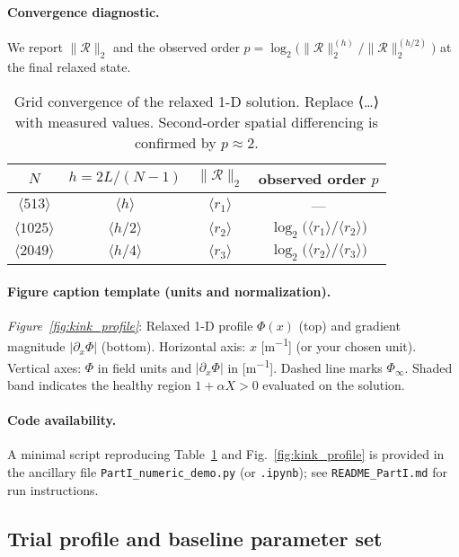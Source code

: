 \documentclass{article}
\begin{document}
\paragraph{Convergence diagnostic.}
We report $\|\mathcal{R}\|_2$ and the observed order 
$p=\log_2\!\big(\|\mathcal{R}\|_2^{(h)}/\|\mathcal{R}\|_2^{(h/2)}\big)$ at the final relaxed state.

\begin{table}[t]
\centering
\caption{Grid convergence of the relaxed 1-D solution. Replace ⟨…⟩ with measured values. Second-order spatial differencing is confirmed by $p\approx2$.}
\label{tab:convergence_1D}
\begin{tabular}{cccc}
\hline\hline
$N$ & $h=2L/(N-1)$ & $\|\mathcal{R}\|_2$ & observed order $p$ \\
\hline
$\langle 513\rangle$  & $\langle h\rangle$      & $\langle r_1\rangle$ & — \\
$\langle 1025\rangle$ & $\langle h/2\rangle$    & $\langle r_2\rangle$ & $\displaystyle \log_2\!\big(\langle r_1\rangle/\langle r_2\rangle\big)$ \\
$\langle 2049\rangle$ & $\langle h/4\rangle$    & $\langle r_3\rangle$ & $\displaystyle \log_2\!\big(\langle r_2\rangle/\langle r_3\rangle\big)$ \\
\hline\hline
\end{tabular}
\end{table}

\paragraph{Figure caption template (units and normalization).}
\emph{Figure~\ref{fig:kink_profile}}: Relaxed 1-D profile $\Phi(x)$ (top) and gradient magnitude $|\partial_x\Phi|$ (bottom). 
Horizontal axis: $x$ [\si{m^{-1}}] (or your chosen unit). 
Vertical axes: $\Phi$ in field units and $|\partial_x\Phi|$ in [\si{m^{-1}}]. 
Dashed line marks $\Phi_\infty$. Shaded band indicates the healthy region $1+\alpha X>0$ evaluated on the solution.

\paragraph{Code availability.}
A minimal script reproducing Table~\ref{tab:convergence_1D} and Fig.~\ref{fig:kink_profile} is provided in the ancillary file \texttt{PartI\_numeric\_demo.py} (or \texttt{.ipynb}); see \texttt{README\_PartI.md} for run instructions.


\subsection{Trial profile and baseline parameter set}
\label{subsec:trial}
\end{document}
